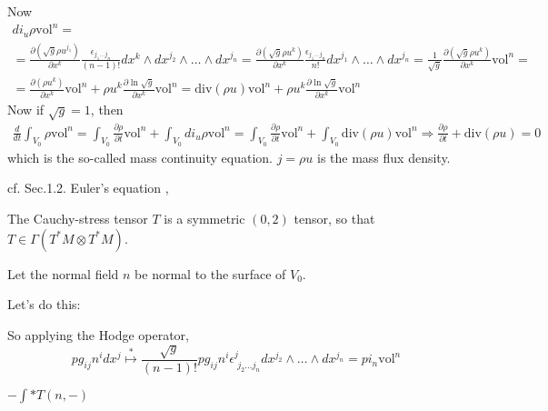 \documentclass[twoside,landscape,10pt]{amsart}
\theoremstyle{plain}
\theoremstyle{definition}
\theoremstyle{remark}
\theoremstyle{remark}
\begin{document}
\begin{multicols*}{2}
Now 
\[
\begin{gathered}
  di_u \rho \text{vol}^n = \\
  = \frac{ \partial ( \sqrt{g} \rho u^{j_1} ) }{ \partial x^k} \frac{ \epsilon_{j_1 \dots j_n} }{ (n-1)! } dx^k \wedge dx^{j_2} \wedge \dots \wedge dx^{j_n} = \frac{ \partial (\sqrt{ g} \rho u^k) }{ \partial x^k} \frac{ \epsilon_{j_1 \dots j_n }}{ n!} dx^{j_1} \wedge \dots \wedge dx^{j_n} = \frac{1}{\sqrt{g}} \frac{ \partial (\sqrt{g} \rho u^k)}{ \partial x^k} \text{vol}^n = \\
  = \frac{ \partial (\rho u^k)}{ \partial x^k} \text{vol}^n + \rho u^k \frac{ \partial \ln{ \sqrt{g}}}{ \partial x^k} \text{vol}^n = \text{div}(\rho u) \text{vol}^n + \rho u^k \frac{ \partial \ln{ \sqrt{g}}}{ \partial x^k} \text{vol}^n
\end{gathered}
\]
Now if $\sqrt{g}=1$, then 
\[
\begin{gathered}
  \frac{d}{dt} \int_{V_0} \rho \text{vol}^n = \int_{V_0} \frac{ \partial \rho }{ \partial t} \text{vol}^n + \int_{V_0} di_u \rho \text{vol}^n = \int_{V_0} \frac{ \partial \rho }{ \partial t} \text{vol}^n + \int_{V_0} \text{div}(\rho u) \text{vol}^n \Longrightarrow \frac{ \partial \rho}{\partial t} + \text{div}(\rho u) = 0
\end{gathered}
\]
which is the so-called mass continuity equation.  $ j = \rho u$ is the mass flux density.  

cf. Sec.1.2. Euler's equation \cite{LLandauELifshitz1987}, 

The Cauchy-stress tensor $T$ is a symmetric $(0,2)$ tensor, so that $T \in \Gamma(T^*M \otimes T^*M)$.  

Let the normal field $n$ be normal to the surface of $V_0$.  

Let's do this:


So applying the Hodge operator, 
\[
pg_{ij} n^i dx^j \overset{*}{\mapsto} \frac{ \sqrt{g}}{(n-1)!} pg_{ij} n^i \epsilon^j_{ \,\, j_2 \dots j_n} dx^{j_2} \wedge \dots \wedge dx^{j_n} = pi_n \text{vol}^n
\]

$-\int * T(n,-)$


\end{multicols*}
\end{document}
